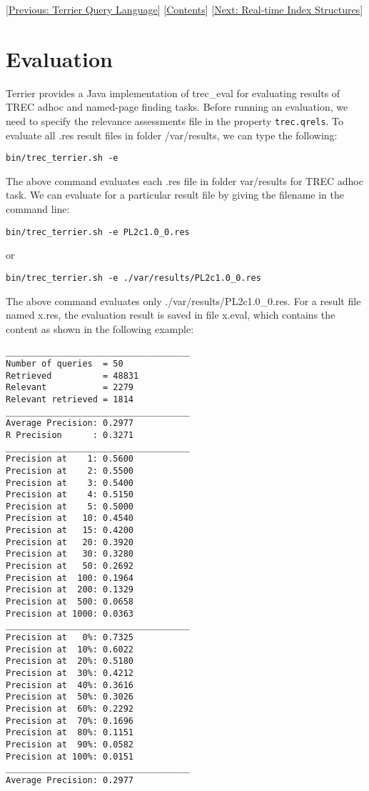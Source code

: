 {[}\href{querylanguage.html}{Previous: Terrier Query Language}{]}
{[}\href{index.html}{Contents}{]} {[}\href{realtime_indices.html}{Next:
Real-time Index Structures}{]}\\

\section{Evaluation}\label{evaluation}

Terrier provides a Java implementation of trec\_eval for evaluating
results of TREC adhoc and named-page finding tasks. Before running an
evaluation, we need to specify the relevance assessments file in the
property \texttt{trec.qrels}. To evaluate all .res result files in
folder /var/results, we can type the following:

\begin{verbatim}
bin/trec_terrier.sh -e
\end{verbatim}

The above command evaluates each .res file in folder var/results for
TREC adhoc task. We can evaluate for a particular result file by giving
the filename in the command line:

\begin{verbatim}
bin/trec_terrier.sh -e PL2c1.0_0.res
\end{verbatim}

or

\begin{verbatim}
bin/trec_terrier.sh -e ./var/results/PL2c1.0_0.res
\end{verbatim}

The above command evaluates only ./var/results/PL2c1.0\_0.res. For a
result file named x.res, the evaluation result is saved in file x.eval,
which contains the content as shown in the following example:

\begin{verbatim}
____________________________________
Number of queries  = 50
Retrieved          = 48831
Relevant           = 2279
Relevant retrieved = 1814
____________________________________
Average Precision: 0.2977
R Precision      : 0.3271
____________________________________
Precision at    1: 0.5600
Precision at    2: 0.5500
Precision at    3: 0.5400
Precision at    4: 0.5150
Precision at    5: 0.5000
Precision at   10: 0.4540
Precision at   15: 0.4200
Precision at   20: 0.3920
Precision at   30: 0.3280
Precision at   50: 0.2692
Precision at  100: 0.1964
Precision at  200: 0.1329
Precision at  500: 0.0658
Precision at 1000: 0.0363
____________________________________
Precision at   0%: 0.7325
Precision at  10%: 0.6022
Precision at  20%: 0.5180
Precision at  30%: 0.4212
Precision at  40%: 0.3616
Precision at  50%: 0.3026
Precision at  60%: 0.2292
Precision at  70%: 0.1696
Precision at  80%: 0.1151
Precision at  90%: 0.0582
Precision at 100%: 0.0151
____________________________________
Average Precision: 0.2977
\end{verbatim}

